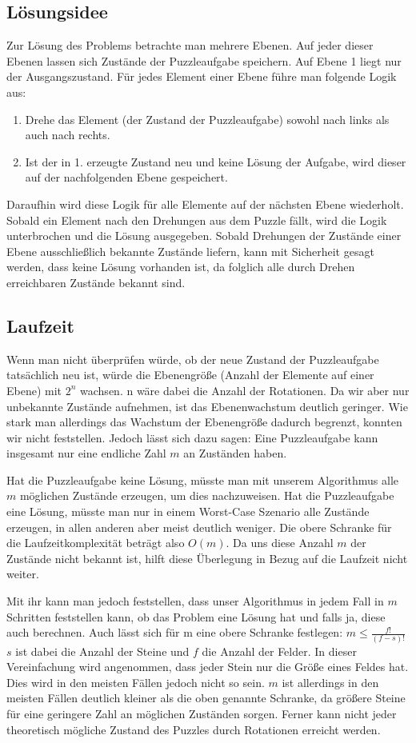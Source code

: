 \subsection {Lösungsidee}
	Zur Lösung des Problems betrachte man mehrere Ebenen. Auf jeder dieser Ebenen lassen sich Zustände der Puzzleaufgabe speichern.
	Auf Ebene 1 liegt nur der Ausgangszustand. Für jedes Element einer Ebene führe man folgende Logik aus:

	\begin{enumerate}
		\item Drehe das Element (der Zustand der Puzzleaufgabe) sowohl nach links als auch nach rechts.
		\item Ist der in 1. erzeugte Zustand neu und keine Lösung der Aufgabe, wird dieser auf der nachfolgenden Ebene gespeichert.
	\end{enumerate}

	Daraufhin wird diese Logik für alle Elemente auf der nächsten Ebene wiederholt.
	Sobald ein Element nach den Drehungen aus dem Puzzle fällt, wird die Logik unterbrochen und die Lösung ausgegeben. Sobald Drehungen der Zustände einer Ebene ausschließlich bekannte Zustände liefern, kann mit Sicherheit gesagt werden, dass keine Lösung vorhanden ist, da folglich alle durch Drehen erreichbaren Zustände bekannt sind.

\subsection{Laufzeit}
	Wenn man nicht überprüfen würde, ob der neue Zustand der Puzzleaufgabe tatsächlich neu ist, würde die Ebenengröße (Anzahl der Elemente auf einer Ebene) mit \(2^n\) wachsen.
	n wäre dabei die Anzahl der Rotationen. Da wir aber nur unbekannte Zustände aufnehmen, ist das Ebenenwachstum deutlich geringer.
	Wie stark man allerdings das Wachstum der Ebenengröße dadurch begrenzt, konnten wir nicht feststellen. Jedoch lässt sich dazu sagen:
	Eine Puzzleaufgabe kann insgesamt nur eine endliche Zahl \(m\) an Zuständen haben.

	Hat die Puzzleaufgabe keine Lösung, müsste man mit unserem Algorithmus alle \(m\) möglichen Zustände erzeugen, um dies nachzuweisen.
	Hat die Puzzleaufgabe eine Lösung, müsste man nur in einem Worst-Case Szenario alle  Zustände erzeugen, in allen anderen aber meist deutlich weniger.
	Die obere Schranke für die Laufzeitkomplexität beträgt also \(O(m)\). Da uns diese Anzahl \(m\) der Zustände nicht bekannt ist,
	hilft diese Überlegung in Bezug auf die Laufzeit nicht weiter.

	Mit ihr kann man jedoch feststellen, dass unser Algorithmus in jedem Fall in \(m\) Schritten feststellen kann, ob das Problem eine Lösung hat und falls ja, diese auch berechnen.
	Auch lässt sich für m eine obere Schranke festlegen: \(m \le \frac{f!}{(f-s)!}\) \(s\) ist dabei die Anzahl der Steine und \(f\) die Anzahl der Felder.
	In dieser Vereinfachung wird angenommen, dass jeder Stein nur die Größe eines Feldes hat. Dies wird in den meisten Fällen jedoch nicht so sein.
	\(m\) ist allerdings in den meisten Fällen deutlich kleiner als die oben genannte Schranke, da größere Steine für eine geringere Zahl an möglichen Zuständen sorgen.
	Ferner kann nicht jeder theoretisch mögliche Zustand des Puzzles durch Rotationen erreicht werden.

